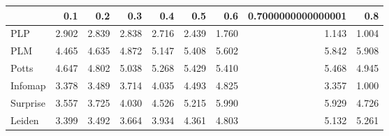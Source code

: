 \begin{tabular}{lrrrrrrrr}
\toprule
{} &   0.1 &   0.2 &   0.3 &   0.4 &   0.5 &   0.6 & 0.7000000000000001 &   0.8 \\
\midrule
PLP      & 2.902 & 2.839 & 2.838 & 2.716 & 2.439 & 1.760 &              1.143 & 1.004 \\
PLM      & 4.465 & 4.635 & 4.872 & 5.147 & 5.408 & 5.602 &              5.842 & 5.908 \\
Potts    & 4.647 & 4.802 & 5.038 & 5.268 & 5.429 & 5.410 &              5.468 & 4.945 \\
Infomap  & 3.378 & 3.489 & 3.714 & 4.035 & 4.493 & 4.825 &              3.357 & 1.000 \\
Surprise & 3.557 & 3.725 & 4.030 & 4.526 & 5.215 & 5.990 &              5.929 & 4.726 \\
Leiden   & 3.399 & 3.492 & 3.664 & 3.934 & 4.361 & 4.803 &              5.132 & 5.261 \\
\bottomrule
\end{tabular}
